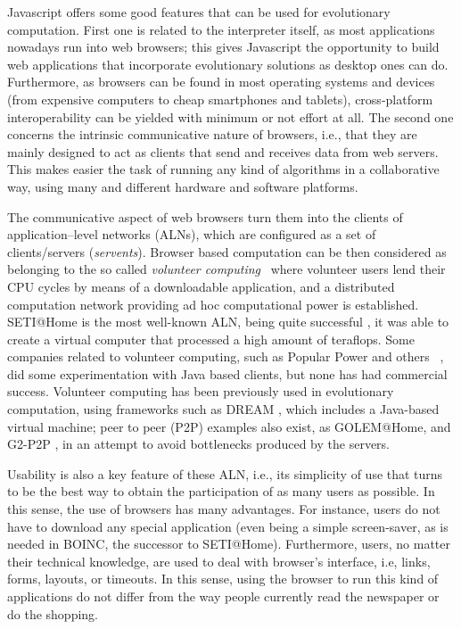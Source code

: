 \documentclass[runningheads,a4paper]{llncs}
\begin{document}
Javascript offers some good features that can be used for evolutionary computation. First one is related to the interpreter itself, as most applications nowadays run into web browsers; this gives Javascript the opportunity to build web applications that incorporate evolutionary solutions as desktop ones can do. Furthermore, as browsers can be found in most operating systems and devices (from expensive computers to cheap smartphones and tablets), cross-platform interoperability can be yielded with minimum or not effort at all. The second one concerns the intrinsic communicative nature of browsers, i.e., that they are mainly designed to act as clients that send and receives data from web servers. This makes easier the task of running any kind of algorithms in a collaborative way, using many and different hardware and software platforms. 

The communicative aspect of web browsers turn them into the clients of application--level networks (ALNs), which are configured as a set of
clients/servers ({\em servents}). Browser based computation can be then considered as belonging to the so called  {\em volunteer computing}~\cite{sarmenta-bayanihan,hpvc} where volunteer users lend their CPU cycles by means of a downloadable application, and a distributed computation network providing ad hoc computational power is established. SETI@Home is the most well-known ALN, being quite successful \cite{david-seti:home}, it was able to	
create a virtual computer that processed a high amount of
teraflops.  Some companies related to volunteer computing, such as Popular Power and
others ~\cite{Cappello}, did some experimentation with Java based
clients, but none has had commercial success. Volunteer computing has
been previously used in evolutionary computation, using
frameworks such as DREAM \cite{LNCS2439:ID197:pp665}, which includes a
Java-based virtual machine; peer to peer (P2P) examples also exist, as  GOLEM@Home, and G2-P2P \cite{G2-P2P}, in an attempt to avoid bottlenecks produced by the servers.


Usability is also a key feature of these ALN, i.e., its simplicity
of use that turns to be the best way to obtain the participation of as
many users as possible. In this sense, the use of browsers has many advantages. For instance, users do not have to download any special application (even being a simple screen-saver, as is needed in BOINC, the successor to SETI@Home). Furthermore, users, no matter their technical knowledge, are used to deal with browser's interface, i.e, links, forms, layouts, or timeouts. In this sense, using the browser to run this kind of applications do not differ from the way people currently read the newspaper or do the shopping.
\end{document}
